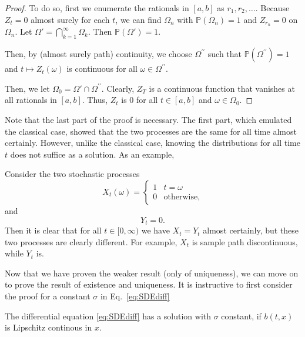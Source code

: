 \documentclass[prb,12pt]{revtex4-2}
\theoremstyle{definition}
\theoremstyle{definition}
\theoremstyle{definition}
\begin{document}
\begin{proof}
To do so, first we enumerate the rationals in $[a,b]$ as $r_1,r_2, \dots$. Because $Z_t=0$ almost surely for each $t$, we can find $\Omega_n$ with $\mathbb{P}(\Omega_n)=1$ and $Z_{r_n}=0$ on $\Omega_n$. Let $\Omega' = \bigcap_{k=1}^\infty \Omega_k$. Then $\mathbb{P}(\Omega')=1$.

Then, by (almost surely path) continuity, we choose $\Omega^{\prime\prime}$ such that $\mathbb{P}(\Omega^{\prime\prime})=1$ and $t\mapsto Z_t(\omega)$ is continuous for all $\omega\in \Omega^{\prime\prime}$.

Then, we let $\Omega_0=\Omega'\cap \Omega^{\prime\prime}$. Clearly, $Z_T$ is a continuous function that vanishes at all rationals in $[a,b]$. Thus, $Z_t$ is $0$ for all $t\in [a,b]$ and $\omega\in \Omega_0$.
\end{proof}
Note that the last part of the proof is necessary. The first part, which emulated the classical case, showed that the two processes are the same for all time almost certainly. However, unlike the classical case, knowing the distributions for all time $t$ does not suffice as a solution. As an example,
\begin{Example}
	Consider the two stochastic processes
	\[
	X_t(\omega) = \begin{cases}
		1 & t = \omega\\
		0  & \text{otherwise,}
	\end{cases}
	\]
	and
	\[
	Y_t=0
	.\] 
	Then it is clear that for all $t\in [0,\infty)$ we have $X_t=Y_t$ almost certainly, but these two processes are clearly different. For example, $X_t$ is sample path discontinuous, while $Y_t$ is.
\end{Example}
Now that we have proven the weaker result (only of uniqueness), we can move on to prove the result of existence and uniqueness. It is instructive to first consider the proof for a constant $\sigma$ in Eq.~\eqref{eq:SDEdiff}
\begin{Theorem}
	The differential equation \eqref{eq:SDEdiff} has a solution with $\sigma$ constant, if $b(t, x)$ is Lipschitz continous in $x$.
\end{Theorem}
\end{document}
